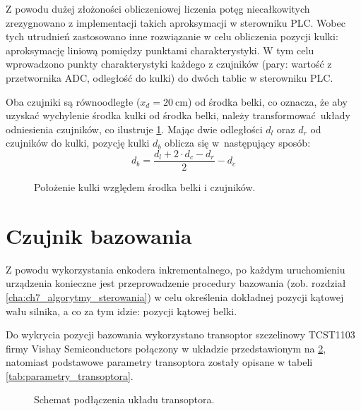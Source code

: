 Z powodu dużej złożoności obliczeniowej liczenia potęg niecałkowitych zrezygnowano z implementacji takich aproksymacji w sterowniku PLC. Wobec tych utrudnień zastosowano inne rozwiązanie w celu obliczenia pozycji kulki: aproksymację liniową pomiędzy punktami charakterystyki. W tym celu wprowadzono punkty charakterystyki każdego z czujników (pary: wartość z przetwornika ADC, odległość do kulki) do dwóch tablic w sterowniku PLC.

Oba czujniki są równoodległe ($x_d = \SI{20}{\centi\meter}$) od środka belki, co oznacza, że aby uzyskać wychylenie środka kulki od środka belki, należy transformować układy odniesienia czujników, co ilustruje \cref{fig:polozenie_kulki}. Mając dwie odległości $d_l$ oraz $d_r$ od czujników do kulki, pozycję kulki $d_b$ oblicza się w~następujący sposób:
\begin{equation}\label{eq:pozycja_kulki}
d_b = \frac{d_l + 2\cdot d_c - d_r}{2} - d_c
\end{equation}

\begin{figure}[H]
    \centering
    
    \caption{Położenie kulki względem środka belki i czujników.}
    \label{fig:polozenie_kulki}
\end{figure}


\section{Czujnik bazowania}
\label{sec:ch3_czujnik_bazowania}

Z powodu wykorzystania enkodera inkrementalnego, po każdym uruchomieniu urządzenia konieczne jest przeprowadzenie procedury bazowania (zob. rozdział \ref{cha:ch7_algorytmy_sterowania}) w celu określenia dokładnej pozycji kątowej wału silnika, a co za tym idzie: pozycji kątowej belki.

Do wykrycia pozycji bazowania wykorzystano transoptor szczelinowy TCST1103 firmy Vishay Semiconductors połączony w układzie przedstawionym na \cref{fig:uklad_transoptora}, natomiast podstawowe parametry transoptora zostały opisane w tabeli \ref{tab:parametry_transoptora}.

\begin{figure}[H]
    \centering
    
    \caption{Schemat podłączenia układu transoptora.}
    \label{fig:uklad_transoptora}
\end{figure}

